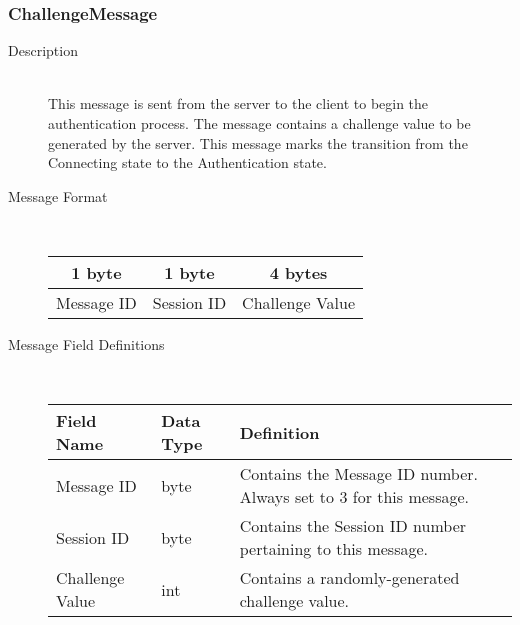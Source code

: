 \documentclass[12pt,letterpaper,titlepage]{article}
\begin{document}
\subsubsection{ChallengeMessage}
	\begin{description}
	\item[Description] \hfill \\
		This message is sent from the server to the client to begin the authentication process.  
		The message contains a challenge value to be generated by the server.  This message marks 
		the transition from the Connecting state to the Authentication state. 	
	\item[Message Format] \hfill \\
	\begin{tabular}{ | c | c | c | }
		\hline
		1 byte & 1 byte & 4 bytes \\
		\hline
		Message ID & Session ID &  Challenge Value \\
		\hline
	\end{tabular}
	\item[Message Field Definitions] \hfill \\
	\begin{tabular}{ | p{3cm} | p{1.5cm} | p{8cm} | }
		\hline
		Field Name & Data Type & Definition \\
		\hline
		Message ID & byte & Contains the Message ID number. 
					\newline Always set to 3 for this message. \\
		\hline
		Session ID & byte & Contains the Session ID number pertaining to this message. \\
		\hline
		Challenge Value & int & Contains a randomly-generated challenge value. \\
		\hline
	\end{tabular}
	\end{description}
\end{document}
